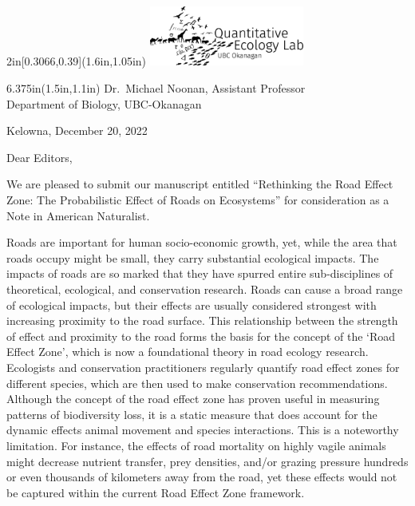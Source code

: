 \documentclass{article}
\begin{document}
\begin{textblock*}{2in}[0.3066,0.39](1.6in,1.05in)
    \includegraphics[width=2in]{Lab_Logo_Trans.png}
\end{textblock*}
\begin{textblock*}{6.375in}(1.5in,1.1in)   %
    \hfill \color{SIgray} Dr.~Michael Noonan, Assistant Professor\\
    \hfill Department of Biology, UBC-Okanagan

\end{textblock*}


\color{black}
\vspace{20pt}
\hfill Kelowna, December 20, 2022

Dear Editors,

We are pleased to submit our manuscript entitled ``Rethinking the Road Effect Zone: The Probabilistic Effect of Roads on Ecosystems'' for consideration as a Note in American Naturalist.

Roads are important for human socio-economic growth, yet, while the area that roads occupy might be small, they carry substantial ecological impacts. The impacts of roads are so marked that they have spurred entire sub-disciplines of theoretical, ecological, and conservation research. Roads can cause a broad range of ecological impacts, but their effects are usually considered strongest with increasing proximity to the road surface. This relationship between the strength of effect and proximity to the road forms the basis for the concept of the  `Road Effect Zone', which is now a foundational theory in road ecology research. Ecologists and conservation practitioners regularly quantify road effect zones for different species, which are then used to make conservation recommendations. Although the concept of the road effect zone has proven useful in measuring patterns of biodiversity loss, it is a static measure that does account for the dynamic effects animal movement and species interactions. This is a noteworthy limitation. For instance, the effects of road mortality on highly vagile animals might decrease nutrient transfer, prey densities, and/or grazing pressure hundreds or even thousands of kilometers away from the road, yet these effects would not be captured within the current Road Effect Zone framework.
\end{document}
